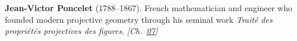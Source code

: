 \textbf{Jean-Victor Poncelet} (1788–1867). French mathematician and engineer who founded modern projective geometry through his seminal work \emph{Trait\'{e} des propri\'{e}t\'{e}s projectives des figures}. \emph{[Ch.~\hyperref[ch:billiardsconicsporism]{07}]}


